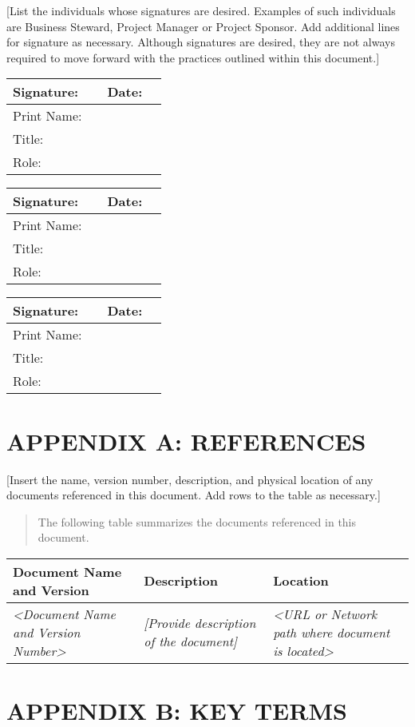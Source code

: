 \documentclass[a4paper, 11pt]{article}
\begin{document}
{[}List the individuals whose signatures are desired. Examples of such
individuals are Business Steward, Project Manager or Project Sponsor.
Add additional lines for signature as necessary. Although signatures are
desired, they are not always required to move forward with the practices
outlined within this document.{]}

\begin{longtable}[]{@{}llll@{}}
\toprule
Signature: & & Date: &\tabularnewline
\midrule
\endhead
Print Name: & & &\tabularnewline
Title: & & &\tabularnewline
Role: & & &\tabularnewline
\bottomrule
\end{longtable}

\begin{longtable}[]{@{}llll@{}}
\toprule
Signature: & & Date: &\tabularnewline
\midrule
\endhead
Print Name: & & &\tabularnewline
Title: & & &\tabularnewline
Role: & & &\tabularnewline
\bottomrule
\end{longtable}

\begin{longtable}[]{@{}llll@{}}
\toprule
Signature: & & Date: &\tabularnewline
\midrule
\endhead
Print Name: & & &\tabularnewline
Title: & & &\tabularnewline
Role: & & &\tabularnewline
\bottomrule
\end{longtable}

\section{APPENDIX A: REFERENCES}

{[}Insert the name, version number, description, and physical location
of any documents referenced in this document. Add rows to the table as
necessary.{]}

\begin{quote}
The following table summarizes the documents referenced in this
document.
\end{quote}

\begin{longtable}[]{@{}lll@{}}
\toprule
\textbf{Document Name and Version} & \textbf{Description} &
\textbf{Location}\tabularnewline
\midrule
\endhead
\emph{\textless{}Document Name and Version Number\textgreater{}} &
\emph{{[}Provide description of the document{]}} & \emph{\textless{}URL
or Network path where document is located\textgreater{}}\tabularnewline
\bottomrule
\end{longtable}

\section{APPENDIX B: KEY TERMS}
\end{document}

